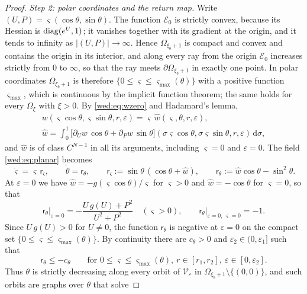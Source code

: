 \begin{proof}
\emph{Step 2: polar coordinates and the return map.} Write $(U,P)=\varsigma(\cos\theta,\sin\theta)$. The function $\mathcal E_0$ is strictly convex, because its Hessian is $\operatorname{diag}(e^U,1)$; it vanishes together with its gradient at the origin, and it tends to infinity as $|(U,P)|\to\infty$. Hence $\Omega_{\xi_b+1}$ is compact and convex and contains the origin in its interior, and along every ray from the origin $\mathcal E_0$ increases strictly from $0$ to $\infty$, so that the ray meets $\partial\Omega_{\xi_b+1}$ in exactly one point. In polar coordinates $\Omega_{\xi_b+1}$ is therefore $\{0\le\varsigma\le\varsigma_{\max}(\theta)\}$ with a positive function $\varsigma_{\max}$, which is continuous by the implicit function theorem; the same holds for every $\Omega_\xi$ with $\xi>0$. By \eqref{wed:eq:wzero} and Hadamard's lemma,
\begin{gather*}
w(\varsigma\cos\theta,\varsigma\sin\theta,r,\varepsilon)=\varsigma\,\hat w(\varsigma,\theta,r,\varepsilon),\\
\hat w=\int_0^1\bigl[\partial_Uw\,\cos\theta+\partial_Pw\,\sin\theta\bigr](\sigma\varsigma\cos\theta,\sigma\varsigma\sin\theta,r,\varepsilon)\,\mathrm d\sigma,
\end{gather*}
and $\hat w$ is of class $C^{N-1}$ in all its arguments, including $\varsigma=0$ and $\varepsilon=0$. The field \eqref{wed:eq:planar} becomes
\begin{equation}\label{wed:eq:polar}
\dot\varsigma=\varsigma\,\mathsf r_\varsigma,\qquad \dot\theta=\mathsf r_\theta,\qquad
\mathsf r_\varsigma:=\sin\theta\,(\cos\theta+\hat w),\qquad \mathsf r_\theta:=\hat w\cos\theta-\sin^2\theta .
\end{equation}
At $\varepsilon=0$ we have $\hat w=-g(\varsigma\cos\theta)/\varsigma$ for $\varsigma>0$ and $\hat w=-\cos\theta$ for $\varsigma=0$, so that
\[
\mathsf r_\theta\big|_{\varepsilon=0}=-\frac{U\,g(U)+P^2}{U^2+P^2}\quad(\varsigma>0),\qquad \mathsf r_\theta\big|_{\varepsilon=0,\ \varsigma=0}=-1 .
\]
Since $U\,g(U)>0$ for $U\neq0$, the function $\mathsf r_\theta$ is negative at $\varepsilon=0$ on the compact set $\{0\le\varsigma\le\varsigma_{\max}(\theta)\}$. By continuity there are $c_\theta>0$ and $\varepsilon_2\in(0,\varepsilon_1]$ such that
\begin{equation}\label{wed:eq:angular}
\mathsf r_\theta\le-c_\theta\qquad\text{for }0\le\varsigma\le\varsigma_{\max}(\theta),\ r\in[r_1,r_2],\ \varepsilon\in[0,\varepsilon_2].
\end{equation}
Thus $\theta$ is strictly decreasing along every orbit of $\mathcal V_\varepsilon$ in $\Omega_{\xi_b+1}\setminus\{(0,0)\}$, and such orbits are graphs over $\theta$ that solve

\end{proof}
